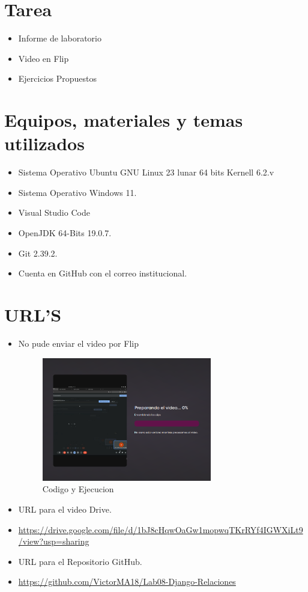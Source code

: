 \documentclass{article}
\begin{document}
	\section{Tarea}
	\begin{itemize}		
		\item Informe de laboratorio
        \item Video en Flip
        \item Ejercicios Propuestos
	\end{itemize}
		
	\section{Equipos, materiales y temas utilizados}
	\begin{itemize}
		\item Sistema Operativo Ubuntu GNU Linux 23 lunar 64 bits Kernell 6.2.v
		\item Sistema Operativo Windows 11.
		\item Visual Studio Code
		\item OpenJDK 64-Bits 19.0.7.
		\item Git 2.39.2.
		\item Cuenta en GitHub con el correo institucional.	
	\end{itemize}
	
	\section{URL'S}
	\begin{itemize}
        \item No pude enviar el video por Flip
        \begin{figure}[H]
            \centering
            \includegraphics[width=0.7\textwidth]{img/Flip.png}
            \caption{Codigo y Ejecucion}
        \end{figure}
        \item URL para el video Drive.
        \item \url{https://drive.google.com/file/d/1bJ8cHqwOaGw1mopwqTKrRYf4IGWXiLt9/view?usp=sharing}
		\item URL para el Repositorio GitHub.
		\item \url{https://github.com/VictorMA18/Lab08-Django-Relaciones}
	\end{itemize}
	
\end{document}
